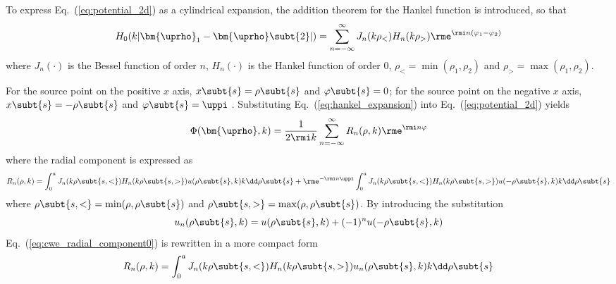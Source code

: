 To express Eq.~(\ref{eq:potential_2d}) as a cylindrical expansion, the addition theorem for the Hankel function is introduced, so that \cite{Poletti2019CylindricalExpansionsSound, Williams1999FourierAcousticsSound}
\begin{equation}
    H_0(k |\bm{\uprho}_1-\bm{\uprho}\subt{2}|)
    = \sum_{n=-\infty}^\infty J_n(k \rho_<)H_n(k \rho_>) \rme^{\rmi n (\varphi_1-\varphi_2)}
    \label{eq:hankel_expansion}
\end{equation}
where $J_n(\cdot)$ is the Bessel function of order $n$, $H_n(\cdot)$ is the Hankel function of order 0, $\rho_{<} = \min(\rho_1,\rho_2)$ and $\rho_>=\max(\rho_1,\rho_2)$.

For the source point on the positive $x$ axis, $x\subt{s} = \rho\subt{s}$ and $\varphi\subt{s} =0 $; 
for the source point on the negative $x$ axis, $x\subt{s} = -\rho\subt{s}$ and $\varphi\subt{s} = \uppi$ . 
Substituting Eq.~(\ref{eq:hankel_expansion}) into Eq.~(\ref{eq:potential_2d}) yields
\begin{equation}
    \Phi(\bm{\uprho},k) = \frac{1}{2\rmi k}
    \sum_{n=-\infty}^\infty R_n(\rho, k) \rme^{\rmi n \varphi}
    \label{eq:cwe_potential}
\end{equation}
where the radial component is expressed as
\begin{equation}
    R_n(\rho,k)
    = \int_0^a J_n(k\rho\subt{s,<})
    H_n(k\rho\subt{s,>} )
    u(\rho\subt{s}, k)k\dd \rho\subt{s}
    + \rme^{-\rmi n \uppi}
    \int_0^a J_n(k\rho\subt{s,<} )
    H_n(k\rho\subt{s,>})
    u(-\rho\subt{s}, k)
    k\dd \rho\subt{s}
    \label{eq:cwe_radial_component0}
\end{equation}
where $\rho\subt{s,<}=\min(\rho,\rho\subt{s})$ and $\rho\subt{s,>}=\max(\rho,\rho\subt{s})$.
By introducing the substitution 
\begin{equation}
    u_n(\rho\subt{s}, k) = u(\rho\subt{s}, k)
    +(-1)^n u (-\rho\subt{s},k)
\end{equation}
Eq.~(\ref{eq:cwe_radial_component0}) is rewritten in a more compact form 
\begin{equation}
    R_n(\rho,k) = \int_0^a J_n(k\rho\subt{s,<})
    H_n(k\rho\subt{s,>} ) 
    u_n(\rho\subt{s}, k) 
    k\dd \rho\subt{s}
    \label{eq:cwe_ultra_radial}
\end{equation}

